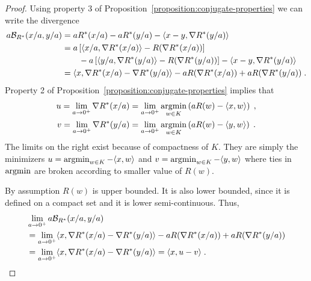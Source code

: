 \begin{proof}
Using property 3 of Proposition~\ref{proposition:conjugate-properties} we can write
the divergence
\begin{align*}
a \mathcal{B}_{R^*}(x/a, y/a) & = a R^*(x/a) - a R^*(y/a) - \langle x - y, \nabla R^*(y/a) \rangle \\
& =
 a \left[ \langle x/a, \nabla R^*(x/a) \rangle - R(\nabla R^*(x/a)) \right] \\
& \qquad - a \left[ \langle y/a, \nabla R^*(y/a) \rangle - R(\nabla R^*(y/a)) \right]
- \langle x - y, \nabla R^*(y/a) \rangle \\
& =
\langle x, \nabla R^*(x/a) - \nabla R^*(y/a) \rangle - a R(\nabla R^*(x/a))
+ a R(\nabla R^*(y/a)) \; .
\end{align*}
Property 2 of Proposition~\ref{proposition:conjugate-properties} implies that
\begin{align*}
u = \lim_{a \to 0^+} \nabla R^*(x/a) & = \lim_{a \to 0^+} \operatorname*{argmin}_{w \in K} \left( a R(w) - \langle x, w \rangle \right) \; , \\
v = \lim_{a \to 0^+} \nabla R^*(y/a) & = \lim_{a \to 0^+} \operatorname*{argmin}_{w \in K} \left( a R(w) - \langle y, w \rangle \right) \; .
\end{align*}
The limits on the right exist because of compactness of $K$. They are simply
the minimizers $u= \operatorname*{argmin}_{w \in K} - \langle x, w \rangle$ and $v= \operatorname*{argmin}_{w
\in K} - \langle y, w \rangle$ where ties in $\operatorname*{argmin}$ are broken according to
smaller value of $R(w)$.

By assumption $R(w)$ is upper bounded. It is also lower bounded, since it is
defined on a compact set and it is lower semi-continuous. Thus,
\begin{align*}
& \lim_{a \to 0^+} a \mathcal{B}_{R^*}(x/a, y/a) \\
& = \lim_{a \to 0^+} \langle x, \nabla R^*(x/a) - \nabla R^*(y/a) \rangle - a R(\nabla R^*(x/a)) + a R(\nabla R^*(y/a)) \\
& = \lim_{a \to 0^+} \langle x, \nabla R^*(x/a) - \nabla R^*(y/a) \rangle = \langle x, u - v \rangle \; .
\end{align*}
\end{proof}
